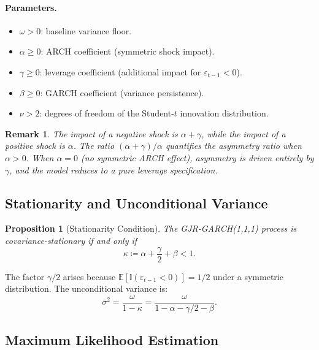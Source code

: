 \documentclass[12pt,a4paper]{article}
\newtheorem{proposition}{Proposition}[section]
\newtheorem{remark}{Remark}[section]
\newcommand{\E}{\mathbb{E}}
\begin{document}
\paragraph{Parameters.}
\begin{itemize}[nosep]
    \item $\omega > 0$: baseline variance floor.
    \item $\alpha \geq 0$: ARCH coefficient (symmetric shock impact).
    \item $\gamma \geq 0$: leverage coefficient (additional impact for $\varepsilon_{t-1} < 0$).
    \item $\beta \geq 0$: GARCH coefficient (variance persistence).
    \item $\nu > 2$: degrees of freedom of the Student-$t$ innovation distribution.
\end{itemize}

\begin{remark}
The impact of a negative shock is $\alpha + \gamma$, while the impact of a positive shock is $\alpha$. The ratio $(\alpha + \gamma)/\alpha$ quantifies the \emph{asymmetry ratio} when $\alpha > 0$. When $\alpha = 0$ (no symmetric ARCH effect), asymmetry is driven entirely by $\gamma$, and the model reduces to a pure leverage specification.
\end{remark}

\subsection{Stationarity and Unconditional Variance}

\begin{proposition}[Stationarity Condition]
The GJR-GARCH(1,1,1) process is covariance-stationary if and only if
\begin{equation}
    \kappa \coloneqq \alpha + \frac{\gamma}{2} + \beta < 1.
    \label{eq:garch-persistence}
\end{equation}
\end{proposition}

The factor $\gamma/2$ arises because $\E[\mathbb{I}(\varepsilon_{t-1} < 0)] = 1/2$ under a symmetric distribution. The unconditional variance is:
\begin{equation}
    \bar{\sigma}^2 = \frac{\omega}{1 - \kappa} = \frac{\omega}{1 - \alpha - \gamma/2 - \beta}.
    \label{eq:garch-uncond}
\end{equation}

\subsection{Maximum Likelihood Estimation}
\end{document}

